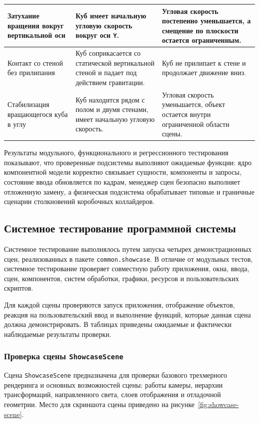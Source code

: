 \begin{xltabular}{\textwidth}{|p{0.29\textwidth}|p{0.35\textwidth}|X|}
\hline
Затухание вращения вокруг вертикальной оси & Куб имеет начальную угловую скорость вокруг оси \texttt{Y}. & Угловая скорость постепенно уменьшается, а смещение по плоскости остается ограниченным. \\
\hline
Контакт со стеной без прилипания & Куб соприкасается со статической вертикальной стеной и падает под действием гравитации. & Куб не прилипает к стене и продолжает движение вниз. \\
\hline
Стабилизация вращающегося куба в углу & Куб находится рядом с полом и двумя стенами, имеет начальную угловую скорость. & Угловая скорость уменьшается, объект остается внутри ограниченной области сцены. \\
\hline
\end{xltabular}
\renewcommand{\arraystretch}{1.0}
\endgroup

Результаты модульного, функционального и регрессионного тестирования показывают,
что проверенные подсистемы выполняют ожидаемые функции: ядро компонентной
модели корректно связывает сущности, компоненты и запросы, состояние ввода
обновляется по кадрам, менеджер сцен безопасно выполняет отложенную замену, а
физическая подсистема обрабатывает типовые и граничные сценарии столкновений
коробочных коллайдеров.

\subsection{Системное тестирование программной системы}

Системное тестирование выполнялось путем запуска четырех демонстрационных сцен,
реализованных в пакете \texttt{common.showcase}. В отличие от модульных тестов,
системное тестирование проверяет совместную работу приложения, окна, ввода,
сцен, компонентов, систем обработки, графики, ресурсов и пользовательских
скриптов.

Для каждой сцены проверяются запуск приложения, отображение объектов, реакция
на пользовательский ввод и выполнение функций, которые данная сцена должна
демонстрировать. В таблицах приведены ожидаемые и фактически наблюдаемые
результаты проверки.

\subsubsection{Проверка сцены \texttt{ShowcaseScene}}

Сцена \texttt{ShowcaseScene} предназначена для проверки базового трехмерного
рендеринга и основных возможностей сцены: работы камеры, иерархии
трансформаций, направленного света, слоев отображения и отладочной геометрии.
Место для скриншота сцены приведено на рисунке~\ref{fig:showcase-scene}.


